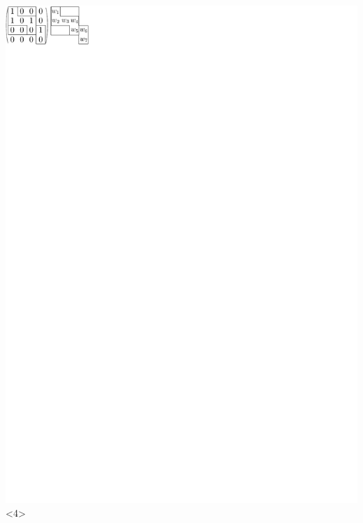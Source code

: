 \documentclass{beamer}
\begin{document}
\begin{frame}
\includegraphics{../img/walkingexample4.pdf}<4>
\end{frame}
\end{document}

